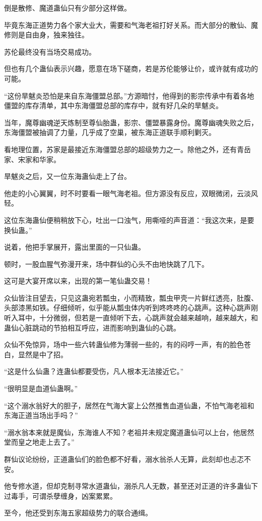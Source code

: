 \begin{this_body}
倒是散修、魔道蛊仙只有少部分这样做。

毕竟东海正道势力各个家大业大，需要和气海老祖打好关系。而大部分的散仙、魔修则是自由身，独来独往。

苏伦最终没有当场交易成功。

但也有几个蛊仙表示兴趣，愿意在场下磋商，若是苏伦能够让价，或许就有成功的可能。

“这份旱魃炎恐怕是来自东海僵盟总部。”方源暗忖，他得到的影宗传承中有着各地僵盟的库存清单，其中东海僵盟总部的库存中，就有好几朵的旱魃炎。

当年，魔尊幽魂逆天炼制至尊仙胎蛊，影宗、僵盟暴露身份。魔尊幽魂失败之后，东海僵盟被抽调了力量，几乎成了空巢，被东海正道联手顺利剿灭。

看地理位置，苏家是最接近东海僵盟总部的超级势力之一。除他之外，还有青岳家、宋家和华家。

旱魃炎之后，又一位东海蛊仙走上了台。

他走的小心翼翼，时不时要看一眼气海老祖。但方源没有反应，双眼微闭，云淡风轻。

这位东海蛊仙便稍稍放下心，吐出一口浊气，用嘶哑的声音道：“我这次来，是要换仙蛊。”

说着，他把手掌展开，露出里面的一只仙蛊。

顿时，一股血腥气弥漫开来，场中群仙的心头不由地快跳了几下。

这可是大宴开席以来，出现的第一笔仙蛊交易！

众仙皆注目望去，只见这蛊宛若瓢虫，小而精致，瓢虫甲壳一片鲜红透亮，肚腹、头部漆黑如铁。仔细倾听，似乎能从瓢虫体内听到咚咚咚的心跳声。这种心跳声刚听入耳中，十分微弱，但若是一直倾听下去，心跳声就会越来越响，越来越大，和蛊仙心脏跳动的节拍相互呼应，进而影响到蛊仙的心跳。

众仙不免惊异，场中一些六转蛊仙修为薄弱一些的，有的闷哼一声，有的脸色苍白，显然是中了招。

“这是什么仙蛊？连蛊仙都要受伤，凡人根本无法接近它。”

“很明显是血道仙蛊啊。”

“这个溺水翁好大的胆子，居然在气海大宴上公然推售血道仙蛊，不怕气海老祖和东海正道当场出手吗？”

“溺水翁本来就是魔仙，东海谁人不知？老祖并未规定魔道蛊仙可以上台，他居然堂而皇之地走上去了。”

群仙议论纷纷，正道蛊仙们的脸色都不好看，溺水翁杀人无算，此刻却也忐忑不安。

他专修水道，但却克制寻常水道蛊仙，溺杀凡人无数，甚至还对正道的许多蛊仙下过毒手，可谓杀孽缠身，凶案累累。

至今，他还受到东海五家超级势力的联合通缉。


\end{this_body}
